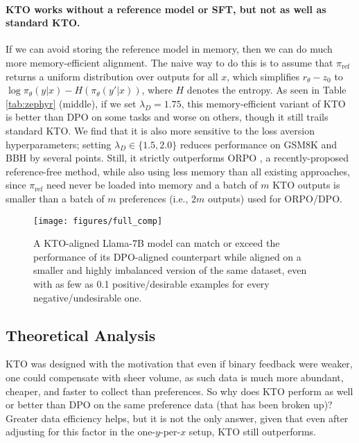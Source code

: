 \paragraph{KTO works without a reference model or SFT, but not as well as standard KTO.}
If we can avoid storing the reference model in memory, then we can do much more memory-efficient alignment.
The naive way to do this is to assume that $\pi_\text{ref}$ returns a uniform distribution over outputs for all $x$, which simplifies $r_\theta - z_0$ to $\log \pi_\theta(y|x) - H(\pi_\theta(y'|x))$, where $H$ denotes the entropy.
As seen in Table \ref{tab:zephyr} (middle), if we set $\lambda_D = 1.75$, this memory-efficient variant of KTO is better than DPO on some tasks and worse on others, though it still trails standard KTO.
We find that it is also more sensitive to the loss aversion hyperparameters; setting $\lambda_D \in \{1.5, 2.0\}$ reduces performance on GSM8K and BBH by several points.
Still, it strictly outperforms ORPO \citep{hong2024reference}, a recently-proposed reference-free method, while also using less memory than all existing approaches, since $\pi_\text{ref}$ need never be loaded into memory and a batch of $m$ KTO outputs is smaller than a batch of $m$ preferences (i.e., $2m$ outputs) used for ORPO/DPO.

\begin{figure}[t]
    \centering
    \texttt{[image: figures/full\_comp]}
    \vspace{-15pt}
    \caption{A KTO-aligned Llama-7B model can match or exceed the performance of its DPO-aligned counterpart while aligned on a smaller and highly imbalanced version of the same dataset, even with as few as 0.1 positive/desirable examples for every negative/undesirable one.
    }
    \label{fig:fracdata}
\end{figure}

\subsection{Theoretical Analysis}
\label{ssec:theory}
KTO was designed with the motivation that even if binary feedback were weaker, one could compensate with sheer volume, as such data is much more abundant, cheaper, and faster to collect than preferences.
So why does KTO perform as well or better than DPO on the same preference data (that has been broken up)?
Greater data efficiency helps, but it is not the only answer, given that even after adjusting for this factor in the one-$y$-per-$x$ setup, KTO still outperforms.

